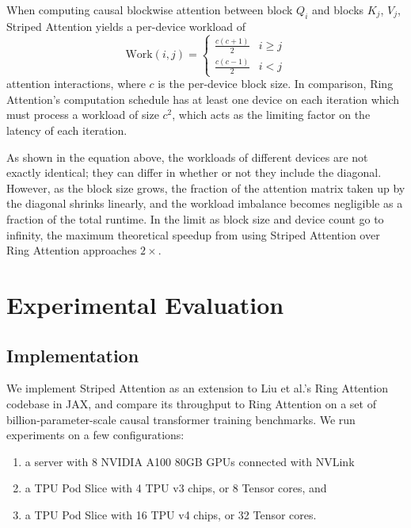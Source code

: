 When computing causal blockwise attention between block $Q_i$ and blocks $K_j$, $V_j$, Striped Attention yields a per-device workload of
\[ \mathrm{Work}(i, j) =

\begin{cases} \frac{c(c+1)}2 & i \ge j \\ \frac{c(c-1)}2 & i < j \end{cases}

\]
attention interactions, where $c$ is the per-device block size. In comparison, Ring Attention's computation schedule has at least one device on each iteration which must process a workload of size $c^2$, which acts as the limiting factor on the latency of each iteration. 

As shown in the equation above, the workloads of different devices are not exactly identical; they can differ in whether or not they include the diagonal. However, as the block size grows, the fraction of the attention matrix taken up by the diagonal shrinks linearly, and the workload imbalance becomes negligible as a fraction of the total runtime. In the limit as block size and device count go to infinity, the maximum theoretical speedup from using Striped Attention over Ring Attention approaches $2\times$.

\section{Experimental Evaluation}

\subsection{Implementation}

We implement Striped Attention as an extension to Liu et al.'s Ring Attention codebase in JAX, and compare its throughput to Ring Attention on a set of billion-parameter-scale causal transformer training benchmarks. We run experiments on a few configurations:

\begin{enumerate}[label=(\arabic*), noitemsep, topsep=0pt]
    \item a server with 8 NVIDIA A100 80GB GPUs connected with NVLink \item a TPU Pod Slice with 4 TPU v3 chips, or 8 Tensor cores, and \item a TPU Pod Slice with 16 TPU v4 chips, or 32 Tensor cores.
\end{enumerate}


